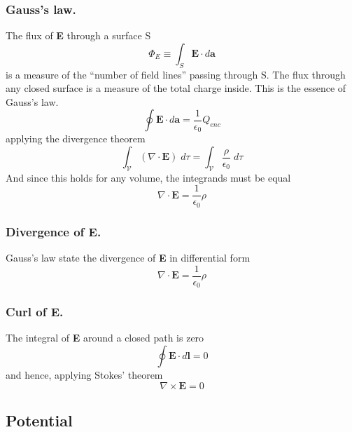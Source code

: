 \documentclass[../../../main.tex]{subfiles}
\begin{document}
\subsubsection*{Gauss's law.} 
The flux of \textbf{E} through a surface S 
\begin{equation*}
    \Phi_E \equiv \int_{S} \mathbf{E}\cdot d\mathbf{a}
\end{equation*}
is a measure of the “number of field lines” passing through S. The flux through any closed surface is a measure of the
total charge inside. This is the essence of Gauss's law. 
\begin{equation*}
    \oint \mathbf{E}\cdot d\mathbf{a}=\frac{1}{\epsilon_0}Q_{enc}
\end{equation*}
applying the divergence theorem
\begin{equation*}
    \int_{\mathcal{V}}(\nabla \cdot \mathbf{E})\;d\tau=\int_{\mathcal{V}} \frac{\rho}{\epsilon_0}\;d\tau
\end{equation*}
And since this holds for any volume, the integrands must be equal
\begin{equation*}
    \nabla \cdot \mathbf{E}=\frac{1}{\epsilon_0}\rho
\end{equation*}

\subsubsection*{Divergence of E.} Gauss's law state the divergence of \textbf{E} in differential form
\begin{equation*}
    \nabla \cdot \mathbf{E}=\frac{1}{\epsilon_0}\rho
\end{equation*}

\subsubsection*{Curl of E.} The integral of \textbf{E} around a closed path is zero 
\begin{equation*}
    \oint \mathbf{E} \cdot d\mathbf{l}  =0
\end{equation*}
and hence, applying Stokes' theorem
\begin{equation*}
    \nabla \times \mathbf{E}  =0
\end{equation*}


\subsection*{Potential}
\end{document}
